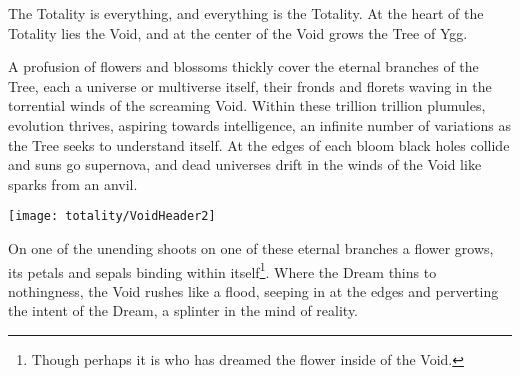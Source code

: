 


    The Totality is everything, and everything is the Totality. At the heart of the Totality lies the Void, and at the center of the Void grows the Tree of Ygg.

    A profusion of flowers and blossoms thickly cover the eternal branches of the Tree, each a universe or multiverse itself, their fronds and florets waving in the torrential winds of the screaming Void. Within these trillion trillion plumules, evolution thrives, aspiring towards intelligence, an infinite number of variations as the Tree seeks to understand itself. At the edges of each bloom black holes collide and suns go supernova, and dead universes drift in the winds of the Void like sparks from an anvil.

\texttt{[image: totality/VoidHeader2]}

    On one of the unending shoots on one of these eternal branches a flower grows, its petals and sepals binding  within itself\footnote{Though perhaps it is \TheAuthority who has dreamed the flower inside of the Void.}. Where the Dream thins to nothingness, the Void rushes like a flood, seeping in at the edges and perverting the intent of the Dream, a splinter in the mind of reality.
